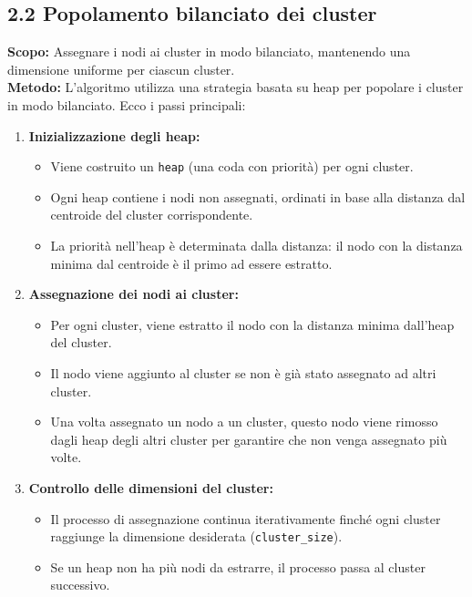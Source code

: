 \documentclass[a4paper,12pt]{article}
\begin{document}
\subsection*{2.2 Popolamento bilanciato dei cluster}
\textbf{Scopo:} Assegnare i nodi ai cluster in modo bilanciato, mantenendo una dimensione uniforme per ciascun cluster.\\
\textbf{Metodo:} L'algoritmo utilizza una strategia basata su heap per popolare i cluster in modo bilanciato. Ecco i passi principali:

\begin{enumerate}
    \item \textbf{Inizializzazione degli heap:}
    \begin{itemize}
        \item Viene costruito un \texttt{heap} (una coda con priorità) per ogni cluster.
        \item Ogni heap contiene i nodi non assegnati, ordinati in base alla distanza dal centroide del cluster corrispondente.
        \item La priorità nell'heap è determinata dalla distanza: il nodo con la distanza minima dal centroide è il primo ad essere estratto.
    \end{itemize}

    \item \textbf{Assegnazione dei nodi ai cluster:}
    \begin{itemize}
        \item Per ogni cluster, viene estratto il nodo con la distanza minima dall'heap del cluster.
        \item Il nodo viene aggiunto al cluster se non è già stato assegnato ad altri cluster.
        \item Una volta assegnato un nodo a un cluster, questo nodo viene rimosso dagli heap degli altri cluster per garantire che non venga assegnato più volte.
    \end{itemize}

    \item \textbf{Controllo delle dimensioni del cluster:}
    \begin{itemize}
        \item Il processo di assegnazione continua iterativamente finché ogni cluster raggiunge la dimensione desiderata (\texttt{cluster\_size}).
        \item Se un heap non ha più nodi da estrarre, il processo passa al cluster successivo.
    \end{itemize}
\end{enumerate}
\end{document}
